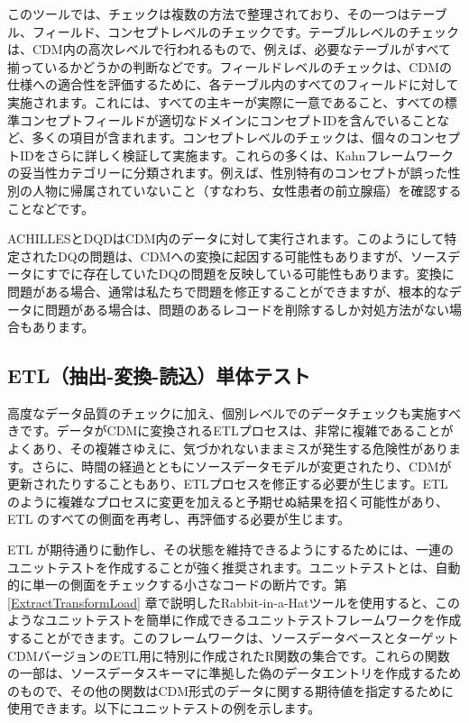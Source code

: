 \documentclass[
  11pt]{book}
\makeatletter
\newenvironment{kframe}{%
\medskip{}
\setlength{\fboxsep}{.8em}
 \def\at@end@of@kframe{}%
 \ifinner\ifhmode%
  \def\at@end@of@kframe{\end{minipage}}%
  \begin{minipage}{\columnwidth}%
 \fi\fi%
 \def\FrameCommand##1{\hskip\@totalleftmargin \hskip-\fboxsep
 \colorbox{myShadeColor}{##1}\hskip-\fboxsep
     \hskip-\linewidth \hskip-\@totalleftmargin \hskip\columnwidth}%
 \MakeFramed {\advance\hsize-\width
   \@totalleftmargin\z@ \linewidth\hsize
   \@setminipage}}%
 {\par\unskip\endMakeFramed%
 \at@end@of@kframe}
\newenvironment{rmdblock}[1]
  {
  \begin{itemize}
  \renewcommand{\labelitemi}{
    \raisebox{-.7\height}[0pt][0pt]{
      {\setkeys{Gin}{width=3em,keepaspectratio}\texttt{[image: images/\#1]}}
    }
  }
  \setlength{\fboxsep}{1em}
  \begin{kframe}
  \item
  }
  {
  \end{kframe}
  \end{itemize}
  }
\newenvironment{rmdimportant}
  {\begin{rmdblock}{important}}
  {\end{rmdblock}}
\theoremstyle{definition}
\theoremstyle{definition}
\theoremstyle{definition}
\theoremstyle{definition}
\theoremstyle{remark}
\makeatother
\begin{document}
このツールでは、チェックは複数の方法で整理されており、その一つはテーブル、フィールド、コンセプトレベルのチェックです。テーブルレベルのチェックは、CDM内の高次レベルで行われるもので、例えば、必要なテーブルがすべて揃っているかどうかの判断などです。フィールドレベルのチェックは、CDMの仕様への適合性を評価するために、各テーブル内のすべてのフィールドに対して実施されます。これには、すべての主キーが実際に一意であること、すべての標準コンセプトフィールドが適切なドメインにコンセプトIDを含んでいることなど、多くの項目が含まれます。コンセプトレベルのチェックは、個々のコンセプトIDをさらに詳しく検証して実施ます。これらの多くは、Kahnフレームワークの妥当性カテゴリーに分類されます。例えば、性別特有のコンセプトが誤った性別の人物に帰属されていないこと（すなわち、女性患者の前立腺癌）を確認することなどです。

\begin{rmdimportant}
ACHILLESとDQDはCDM内のデータに対して実行されます。このようにして特定されたDQの問題は、CDMへの変換に起因する可能性もありますが、ソースデータにすでに存在していたDQの問題を反映している可能性もあります。変換に問題がある場合、通常は私たちで問題を修正することができますが、根本的なデータに問題がある場合は、問題のあるレコードを削除するしか対処方法がない場合もあります。
\end{rmdimportant}

\subsection{ETL（抽出-変換-読込）単体テスト}\label{etlUnitTests}


高度なデータ品質のチェックに加え、個別レベルでのデータチェックも実施すべきです。データがCDMに変換されるETLプロセスは、非常に複雑であることがよくあり、その複雑さゆえに、気づかれないままミスが発生する危険性があります。さらに、時間の経過とともにソースデータモデルが変更されたり、CDMが更新されたりすることもあり、ETLプロセスを修正する必要が生じます。ETL のように複雑なプロセスに変更を加えると予期せぬ結果を招く可能性があり、ETL のすべての側面を再考し、再評価する必要が生じます。

ETL が期待通りに動作し、その状態を維持できるようにするためには、一連のユニットテストを作成することが強く推奨されます。ユニットテストとは、自動的に単一の側面をチェックする小さなコードの断片です。第 \ref{ExtractTransformLoad} 章で説明したRabbit-in-a-Hatツールを使用すると、このようなユニットテストを簡単に作成できるユニットテストフレームワークを作成することができます。このフレームワークは、ソースデータベースとターゲットCDMバージョンのETL用に特別に作成されたR関数の集合です。これらの関数の一部は、ソースデータスキーマに準拠した偽のデータエントリを作成するためのもので、その他の関数はCDM形式のデータに関する期待値を指定するために使用できます。以下にユニットテストの例を示します。
\end{document}
